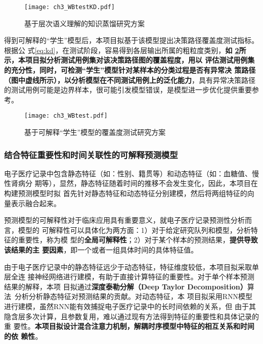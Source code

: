 \begin{figure}[htp]
    \begin{small}
        \begin{center}
            \texttt{[image: ch3\_WBtestKD.pdf]}
        \end{center}
        \caption{基于层次语义理解的知识蒸馏研究方案}
        \label{fig:ch3:WBtestKD}
    \end{small}
\end{figure}

得到可解释的``学生''模型后，本项目拟基于该模型提出决策路径覆盖度测试指标。根据公
式\eqref{eq:kd}，在测试阶段，容易得到各层输出所属的粗粒度类别，\textbf{如
\cref{fig:ch3:WBtest}所示，本项目拟分析测试用例集对该决策路径图的覆盖程度，用以
评估测试用例集的充分性，同时，可检测``学生''模型针对某样本的分类过程是否有异常决
策路径（图中虚线所示），以分析模型在不同测试用例上的泛化能力}，具有异常决策路径
的测试用例可能是边界样本，很可能引发模型错误，是模型进一步优化提供重要参考。
\begin{figure}[htp]
    \begin{small}
        \begin{center}
            \texttt{[image: ch3\_WBtest.pdf]}
        \end{center}
        \caption{基于可解释``学生''模型的覆盖度测试研究方案}
        \label{fig:ch3:WBtest}
    \end{small}
\end{figure}

\subsubsection{结合特征重要性和时间关联性的可解释预测模型}\label{ch3_3}

电子医疗记录中包含静态特征（如：性别、籍贯等）和动态特征（如：血糖值、慢性肾病分
期等），显然，静态特征随着时间的推移不会发生变化，因此，本项目在构建预测模型时拟
首先针对静态特征和动态特征分别建模，然后将两组特征的向量表示融合起来。

预测模型的可解释性对于临床应用具有重要意义，就电子医疗记录预测性分析而言，模型的
可解释性可以具体化为两方面：1）对于给定研究队列和模型，分析特征的重要性，称为模
型的\textbf{全局可解释性}；2）对于某个样本的预测结果，\textbf{提供导致该结果的主
要因素}，即一个或者一组具体时间的具体特征值。

由于电子医疗记录中的静态特征远少于动态特征，特征维度较低，本项目拟采取单层全连
接神经网络进行建模，有助于直接计算特征的重要性。对于单个样本预测结果的解释，本项
目拟通过\textbf{深度泰勒分解（Deep Taylor Decomposition）}算法~分析分析静态特征对预测结果的贡献。对动态特征，本
项目拟采用RNN模型进行建模，虽然RNN能有效捕捉电子医疗记录中的长时间依赖的关系，但
由于其隐含层多次计算，且参数复用，难以通过现有方法得到特征的重要性和具体记录的重
要性。\textbf{本项目拟设计混合注意力机制，解耦时序模型中特征的相互关系和时间的依
赖性}。

